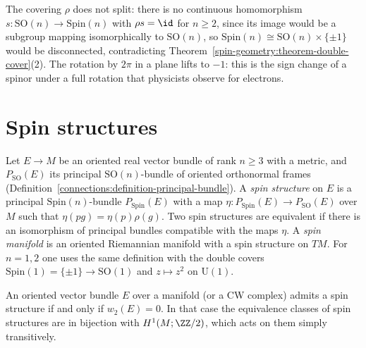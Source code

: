 \begin{counterexample}\label{spin-geometry:counterexample-no-splitting}
The covering $\rho$ does not split: there is no continuous homomorphism $s \colon \mathrm{SO}(n) \to \mathrm{Spin}(n)$ with $\rho s = \id$ for $n \geq 2$, since
its image would be a subgroup mapping isomorphically to $\mathrm{SO}(n)$, so $\mathrm{Spin}(n) \cong \mathrm{SO}(n) \times \{\pm 1\}$ would be disconnected, contradicting Theorem~\ref{spin-geometry:theorem-double-cover}(2). The
rotation by $2\pi$ in a plane lifts to $-1$: this is the sign change of a spinor under a full rotation that physicists observe for electrons.
\end{counterexample}

\section{Spin structures}\label{spin-geometry:section-spin-structures}

\begin{definition}\label{spin-geometry:definition-spin-structure}
Let $E \to M$ be an oriented real vector bundle of rank $n \geq 3$ with a metric, and $P_{\mathrm{SO}}(E)$ its principal $\mathrm{SO}(n)$-bundle of oriented orthonormal frames
(Definition~\ref{connections:definition-principal-bundle}). A \emph{spin structure} on $E$ is a principal $\mathrm{Spin}(n)$-bundle $P_{\mathrm{Spin}}(E)$ with a map $\eta \colon P_{\mathrm{Spin}}(E) \to P_{\mathrm{SO}}(E)$ over $M$ such that
$\eta(pg) = \eta(p)\rho(g)$. Two spin structures are equivalent if there is an isomorphism of principal bundles compatible with the maps $\eta$. A \emph{spin manifold} is an oriented Riemannian manifold with a spin
structure on $TM$. For $n = 1, 2$ one uses the same definition with the double covers $\mathrm{Spin}(1) = \{\pm 1\} \to \mathrm{SO}(1)$ and $z \mapsto z^2$ on $\mathrm{U}(1)$.
\end{definition}

\begin{theorem}\label{spin-geometry:theorem-spin-obstruction}
An oriented vector bundle $E$ over a manifold (or a CW complex) admits a spin structure if and only if $w_2(E) = 0$. In that case the equivalence classes of spin structures are in bijection with $H^1(M; \ZZ/2)$, which acts
on them simply transitively.
\end{theorem}

